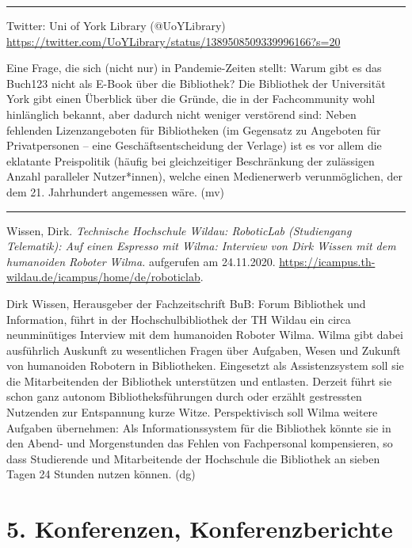 \documentclass[a4paper,
fontsize=11pt,
oneside,
numbers=noperiodatend,
parskip=half-,
bibliography=totoc,
final
]{scrartcl}
\begin{document}
\begin{center}\rule{0.5\linewidth}{0.5pt}\end{center}

Twitter: Uni of York Library (@UoYLibrary)
\url{https://twitter.com/UoYLibrary/status/1389508509339996166?s=20}

Eine Frage, die sich (nicht nur) in Pandemie-Zeiten stellt: Warum gibt
es das Buch123 nicht als E-Book über die Bibliothek? Die Bibliothek der
Universität York gibt einen Überblick über die Gründe, die in der
Fachcommunity wohl hinlänglich bekannt, aber dadurch nicht weniger
verstörend sind: Neben fehlenden Lizenzangeboten für Bibliotheken (im
Gegensatz zu Angeboten für Privatpersonen -- eine Geschäftsentscheidung
der Verlage) ist es vor allem die eklatante Preispolitik (häufig bei
gleichzeitiger Beschränkung der zulässigen Anzahl paralleler
Nutzer*innen), welche einen Medienerwerb verunmöglichen, der dem 21.
Jahrhundert angemessen wäre. (mv)

\begin{center}\rule{0.5\linewidth}{0.5pt}\end{center}

Wissen, Dirk. \emph{Technische Hochschule Wildau: RoboticLab
(Studiengang Telematik): Auf einen Espresso mit Wilma: Interview von
Dirk Wissen mit dem humanoiden Roboter Wilma.} aufgerufen am 24.11.2020.
\url{https://icampus.th-wildau.de/icampus/home/de/roboticlab}.

Dirk Wissen, Herausgeber der Fachzeitschrift BuB: Forum Bibliothek und
Information, führt in der Hochschulbibliothek der TH Wildau ein circa
neunminütiges Interview mit dem humanoiden Roboter Wilma. Wilma gibt
dabei ausführlich Auskunft zu wesentlichen Fragen über Aufgaben, Wesen
und Zukunft von humanoiden Robotern in Bibliotheken. Eingesetzt als
Assistenzsystem soll sie die Mitarbeitenden der Bibliothek unterstützen
und entlasten. Derzeit führt sie schon ganz autonom Bibliotheksführungen
durch oder erzählt gestressten Nutzenden zur Entspannung kurze Witze.
Perspektivisch soll Wilma weitere Aufgaben übernehmen: Als
Informationssystem für die Bibliothek könnte sie in den Abend- und
Morgenstunden das Fehlen von Fachpersonal kompensieren, so dass
Studierende und Mitarbeitende der Hochschule die Bibliothek an sieben
Tagen 24 Stunden nutzen können. (dg)

\hypertarget{konferenzen-konferenzberichte}{%
\section{5. Konferenzen,
Konferenzberichte}\label{konferenzen-konferenzberichte}}
\end{document}
